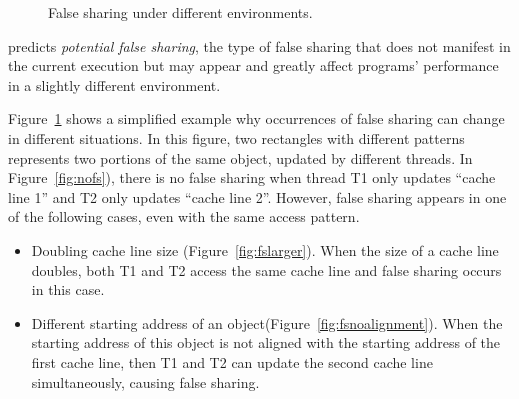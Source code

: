 \begin{figure}
\begin{center} 
%
\hspace{30pt}
%
\hspace{30pt}
%
\end{center}
\caption{False sharing under different environments.}
\label{fig:potentialfalsesharing}
\end{figure}

\Predator{} predicts {\it potential false sharing}, the type of
false sharing that does not 
manifest in the current execution but may appear and greatly affect programs' performance
in a slightly different environment.

Figure~\ref{fig:potentialfalsesharing} shows a simplified example why occurrences of false sharing 
can change in different situations.
In this figure, two rectangles with different patterns
represents two portions of the same object, updated by different threads. 
In Figure~\ref{fig:nofs}), there is no false sharing when thread T1 only updates 
``cache line 1'' and T2 only updates ``cache line 2''.
However, false sharing appears in one of the following cases, even with the same
access pattern. 

\begin{itemize}
\item
Doubling cache line size (Figure~\ref{fig:fslarger}). When the size of a
cache line doubles,
both T1 and T2 access the same cache line and false sharing occurs in this case.

\item
Different starting address of an object(Figure~\ref{fig:fsnoalignment}). 
When the starting address of this object is not aligned with the starting address of 
the first cache line, 
then T1 and T2 can update the second cache line simultaneously, 
causing false sharing. 
\end{itemize} 

